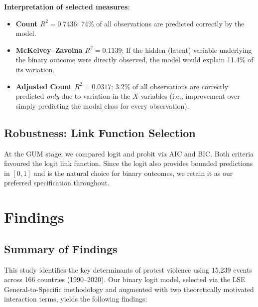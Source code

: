 \documentclass[12pt,a4paper]{article}
\begin{document}
\textbf{Interpretation of selected measures}:
\begin{itemize}
  \item \textbf{Count $R^2 = 0.7436$}: 74\% of all observations are predicted correctly by the model.
  \item \textbf{McKelvey--Zavoina $R^2 = 0.1139$}: If the hidden (latent) variable underlying the binary outcome were directly observed, the model would explain 11.4\% of its variation.
  \item \textbf{Adjusted Count $R^2 = 0.0317$}: 3.2\% of all observations are correctly predicted \emph{only} due to variation in the $X$ variables (i.e., improvement over simply predicting the modal class for every observation).
\end{itemize}

\subsection{Robustness: Link Function Selection}
\label{sec:robustness}

At the GUM stage, we compared logit and probit via AIC and BIC. Both criteria favoured the logit link function. Since the logit also provides bounded predictions in $[0,1]$ and is the natural choice for binary outcomes, we retain it as our preferred specification throughout.

\section{Findings}

\subsection{Summary of Findings}

This study identifies the key determinants of protest violence using 15,239 events across 166 countries (1990--2020). Our binary logit model, selected via the LSE General-to-Specific methodology and augmented with two theoretically motivated interaction terms, yields the following findings:
\end{document}

